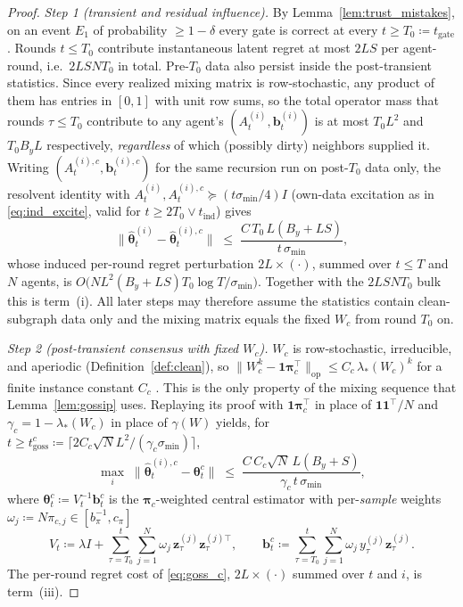 \documentclass[11pt]{article}
\begin{document}
\begin{proof}
\emph{Step 1 (transient and residual influence).}
By Lemma~\ref{lem:trust_mistakes}, on an event $E_1$ of probability
$\geq1-\delta$ every gate is correct at every
$t\geq T_0\coloneqq t_{\mathrm{gate}}$.  Rounds $t\leq T_0$ contribute
instantaneous latent regret at most $2LS$ per agent-round, i.e.\
$2LSNT_0$ in total.  Pre-$T_0$ data also persist inside the
post-transient statistics. Since every realized mixing matrix is
row-stochastic, any product of them has entries in $[0,1]$ with unit
row sums, so the total operator mass that rounds $\tau\leq T_0$
contribute to any agent's $(A_t^{(i)},\bm b_t^{(i)})$ is at most
$T_0L^2$ and $T_0B_yL$ respectively, \emph{regardless} of which
(possibly dirty) neighbors supplied it.  Writing
$(A_t^{(i),c},\bm b_t^{(i),c})$ for the same recursion run on
post-$T_0$ data only, the resolvent identity with
$A_t^{(i)},A_t^{(i),c}\succeq(t\sigma_{\min}/4)I$ (own-data
excitation as in \eqref{eq:ind_excite}, valid for
$t\geq 2T_0\vee t_{\mathrm{ind}}$) gives
\[
\|\widehat{\bm\theta}_t^{(i)}-\widehat{\bm\theta}_t^{(i),c}\|
\;\leq\;\frac{C\,T_0\,L(B_y+LS)}{t\,\sigma_{\min}} ,
\]
whose induced per-round regret perturbation $2L\times(\cdot)$, summed
over $t\leq T$ and $N$ agents, is
$O\bigl(NL^2(B_y+LS)T_0\log T/\sigma_{\min}\bigr)$.  Together with the
$2LSNT_0$ bulk this is term~(i). All later steps may therefore assume
the statistics contain clean-subgraph data only and the mixing matrix
equals the fixed $W_c$ from round $T_0$ on.

\emph{Step 2 (post-transient consensus with fixed $W_c$).}
$W_c$ is row-stochastic, irreducible, and aperiodic
(Definition~\ref{def:clean}), so
$\|W_c^k-\bm 1\bm\pi_c^\top\|_{\mathrm{op}}\leq
C_c\,\lambda_*(W_c)^k$ for a finite instance constant $C_c$
\citep[Thm.~4.9]{levin2017}.  This is the only property of the mixing
sequence that Lemma~\ref{lem:gossip} uses. Replaying its proof with
$\bm 1\bm\pi_c^\top$ in place of $\bm 1\bm 1^\top\!/N$ and
$\gamma_c=1-\lambda_*(W_c)$ in place of $\gamma(W)$ yields, for
$t\geq t_{\mathrm{goss}}^c\coloneqq\lceil 2C_c\sqrt NL^2/(\gamma_c\sigma_{\min})\rceil$,
\begin{equation}
\max_i\;\|\widehat{\bm\theta}_t^{(i),c}-\bm\theta_t^{c}\|
\;\leq\;\frac{C\,C_c\sqrt N\,L(B_y+S)}{\gamma_c\,t\,\sigma_{\min}},
\label{eq:goss_c}
\end{equation}
where $\bm\theta_t^{c}\coloneqq V_t^{-1}\bm b_t^{c}$ is the
$\bm\pi_c$-weighted central estimator with per-\emph{sample} weights
$\omega_j\coloneqq N\pi_{c,j}\in[b_\pi^{-1},c_\pi]$ \[
V_t\coloneqq\lambda I+\sum_{\tau=T_0}^{t}\sum_{j=1}^N
\omega_j\,\bm z_\tau^{(j)}\bm z_\tau^{(j)\top},
\qquad
\bm b_t^{c}\coloneqq\sum_{\tau=T_0}^{t}\sum_{j=1}^N
\omega_j\,y_\tau^{(j)}\bm z_\tau^{(j)} .
\]
The per-round regret cost of \eqref{eq:goss_c}, $2L\times(\cdot)$
summed over $t$ and $i$, is term~(iii).


\end{proof}
\end{document}
